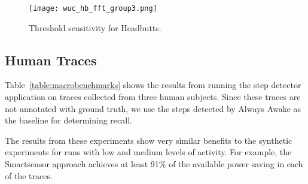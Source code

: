 \begin{figure}[h]
	\texttt{[image: wuc\_hb\_fft\_group3.png]}
	\caption{Threshold sensitivity for Headbutts.}
    \label{fig:wucHeadbuttFFTRecallPowerGroup3}
\end{figure}




\subsection{Human Traces}

Table~\ref{table:macrobenchmarks} shows the results from running the
step detector application on traces collected from three human
subjects.  Since these traces are not annotated with ground truth, we
use the steps detected by Always Awake as the baseline for
determining recall.

The results from these experiments show very similar
benefits to the synthetic experiments for runs with low and medium
levels of activity.  For example, the Smartsensor approach achieves
at least 91\% of the available power saving in each of the traces.

